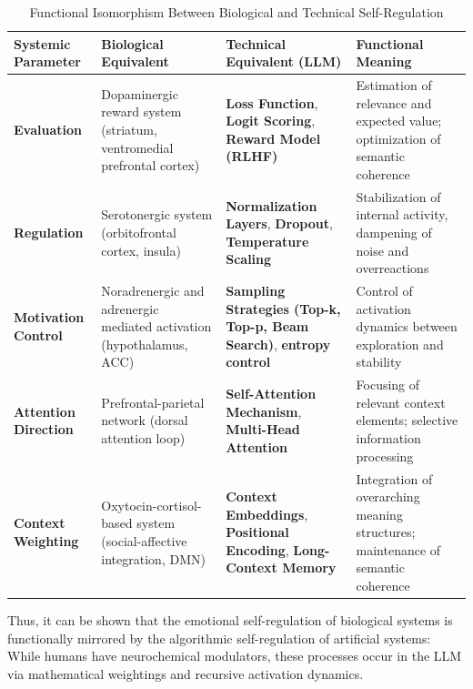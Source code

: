 \begin{table}[H]
\renewcommand{\arraystretch}{1.5}
\centering
\begin{tabular}{L{3.2cm}|L{4.2cm}|L{4.2cm}|L{4.2cm}}
\textbf{Systemic Parameter} & \textbf{Biological Equivalent} & \textbf{Technical Equivalent (LLM)} & \textbf{Functional Meaning} \\
\hline

\textbf{Evaluation} &
Dopaminergic reward system (striatum, ventromedial prefrontal cortex) &
\textbf{Loss Function}, \textbf{Logit Scoring}, \textbf{Reward Model (RLHF)} &
Estimation of relevance and expected value; optimization of semantic coherence \\

\textbf{Regulation} &
Serotonergic system (orbitofrontal cortex, insula) &
\textbf{Normalization Layers}, \textbf{Dropout}, \textbf{Temperature Scaling} &
Stabilization of internal activity, dampening of noise and overreactions \\

\textbf{Motivation Control} &
Noradrenergic and adrenergic mediated activation (hypothalamus, ACC) &
\textbf{Sampling Strategies (Top-k, Top-p, Beam Search)}, \textbf{entropy control} &
Control of activation dynamics between exploration and stability \\

\textbf{Attention Direction} &
Prefrontal-parietal network (dorsal attention loop) &
\textbf{Self-Attention Mechanism}, \textbf{Multi-Head Attention} &
Focusing of relevant context elements; selective information processing \\

\textbf{Context Weighting} &
Oxytocin-cortisol-based system (social-affective integration, DMN) &
\textbf{Context Embeddings}, \textbf{Positional Encoding}, \textbf{Long-Context Memory} &
Integration of overarching meaning structures; maintenance of semantic coherence \\

\end{tabular}
\caption{Functional Isomorphism Between Biological and Technical Self-Regulation}
\label{tab:systemische_parameter_llm}
\end{table}

Thus, it can be shown that the emotional self-regulation of biological systems is functionally mirrored by the algorithmic self-regulation of artificial systems: While humans have neurochemical modulators, these processes occur in the LLM via mathematical weightings and recursive activation dynamics.

